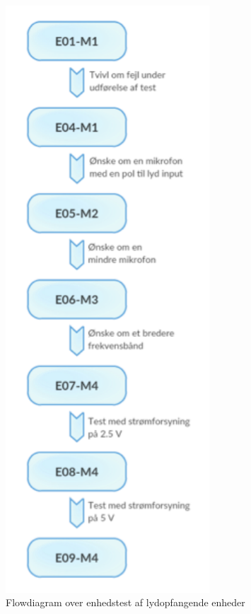 \begin{figure}[htb]
			\centering
				\includegraphics[width=3in]{flowdiagrameop}
				\caption{Flowdiagram over enhedstest af lydopfangende enheder}	
				\label{fig:flowdiagrameop}
			\end{figure}

